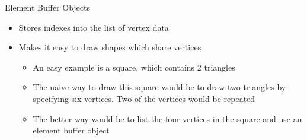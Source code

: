 \documentclass{beamer}
\begin{document}
\begin{frame}[fragile]{Element Buffer Objects}
    \begin{itemize}
        \item Stores indexes into the list of vertex data
        \item Makes it easy to draw shapes which share vertices
              \begin{itemize}
                  \item An easy example is a square, which contains 2 triangles
                  \item The naive way to draw this square would be to draw two triangles by specifying six vertices. Two of
                        the vertices would be repeated
                  \item The better way would be to list the four vertices in the square and use an element buffer object
              \end{itemize}
    \end{itemize}
\end{frame}
\end{document}
